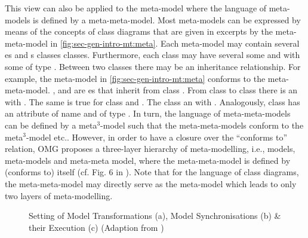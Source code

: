 This view can also be applied to the meta-model where the language of meta-models is defined by a meta-meta-model.
Most meta-models can be expressed by means of the concepts of class diagrams that are given in excerpts by the meta-meta-model in \cref{fig:sec-gen-intro-mt:meta}.
Each meta-model may contain several es and s  classes  classes.
Furthermore, each class may have several   some  and with some  of type .
Between two classes there may be an inheritance relationship.
For example, the meta-model in \cref{fig:sec-gen-intro-mt:meta} conforms to the meta-meta-model.
,  and  are es that inherit from class .
From class  to class  there is an  with  .
The same is true for class  and .
The class   an  with     .
Analogously, class  has an attribute of name  and of type .
In turn, the language of meta-meta-models can be defined by a meta$^3$-model such that the meta-meta-models conform to the meta$^3$-model etc..
However, in order to have a closure over the ``conforms to'' relation, OMG proposes a three-layer hierarchy of meta-modelling, i.e., models, meta-models and meta-meta model, where the meta-meta-model is defined by (conforms to) itself (cf. Fig. 6 in \cite{Henderson-Sellers2013}).
Note that for the language of class diagrams, the meta-meta-model may directly serve as the meta-model which leads to only two layers of meta-modelling.

\begin{figure}[!tb]
\begin{center}
\end{center}
\caption{Setting of Model Transformations (a), Model Synchronisations (b) \& their Execution (c) (Adaption from \cite{FAGT2,Lucio2014})}
\label{fig:sec-gen-intro-msynch:mt_msynch}
\end{figure}

